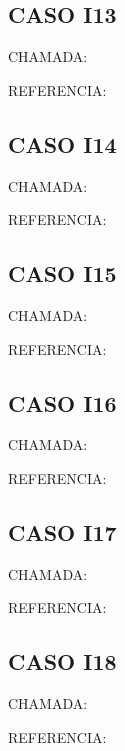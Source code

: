 \documentclass{undftex}
\begin{document}
\begin{refsection}\section*{CASO I13}\noindent CHAMADA:  \par\noindent REFERENCIA:\par\printbibliography[heading=none]\end{refsection}\clearpage
\begin{refsection}\section*{CASO I14}\noindent CHAMADA:  \par\noindent REFERENCIA:\par\printbibliography[heading=none]\end{refsection}\clearpage
\begin{refsection}\section*{CASO I15}\noindent CHAMADA:  \par\noindent REFERENCIA:\par\printbibliography[heading=none]\end{refsection}\clearpage
\begin{refsection}\section*{CASO I16}\noindent CHAMADA:  \par\noindent REFERENCIA:\par\printbibliography[heading=none]\end{refsection}\clearpage
\begin{refsection}\section*{CASO I17}\noindent CHAMADA:  \par\noindent REFERENCIA:\par\printbibliography[heading=none]\end{refsection}\clearpage
\begin{refsection}\section*{CASO I18}\noindent CHAMADA:  \par\noindent REFERENCIA:\par\printbibliography[heading=none]\end{refsection}\clearpage
\end{document}
